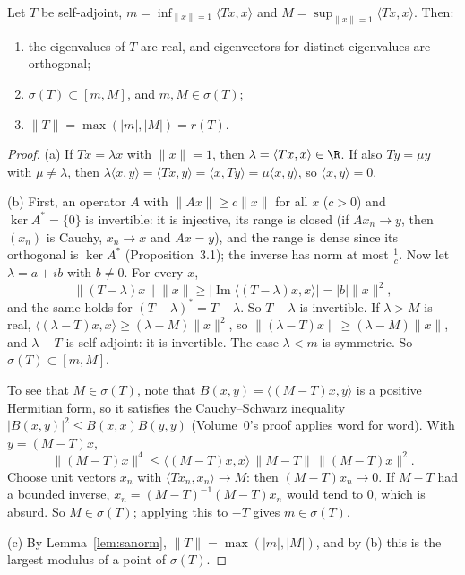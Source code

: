 \begin{proposition}\label{prop:saspec}
Let $T$ be self-adjoint, $m=\inf_{\|x\|=1}\langle Tx,x\rangle$ and $M=\sup_{\|x\|=1}\langle Tx,x\rangle$. Then:
\begin{enumerate}
\item[(a)] the eigenvalues of $T$ are real, and eigenvectors for distinct eigenvalues are orthogonal;
\item[(b)] $\sigma(T)\subset[m,M]$, and $m,M\in\sigma(T)$;
\item[(c)] $\|T\|=\max(|m|,|M|)=r(T)$.
\end{enumerate}
\end{proposition}
\begin{proof}
(a) If $Tx=\lambda x$ with $\|x\|=1$, then $\lambda=\langle Tx,x\rangle\in\R$. If also $Ty=\mu y$ with $\mu\ne\lambda$, then $\lambda\langle x,y\rangle=\langle Tx,y\rangle=\langle x,Ty\rangle=\mu\langle x,y\rangle$, so $\langle x,y\rangle=0$.

(b) First, an operator $A$ with $\|Ax\|\ge c\|x\|$ for all $x$ ($c>0$) and $\ker A^*=\{0\}$ is invertible: it is injective, its range is closed (if $Ax_n\to y$, then $(x_n)$ is Cauchy, $x_n\to x$ and $Ax=y$), and the range is dense since its
orthogonal is $\ker A^*$ (Proposition~3.1); the inverse has norm at most $\frac1c$. Now let $\lambda=a+ib$ with $b\ne0$. For every $x$,
\[\|(T-\lambda)x\|\|x\|\ge|\operatorname{Im}\langle(T-\lambda)x,x\rangle|=|b|\|x\|^2,\]
and the same holds for $(T-\lambda)^*=T-\bar\lambda$. So $T-\lambda$ is invertible. If $\lambda>M$ is real, $\langle(\lambda-T)x,x\rangle\ge(\lambda-M)\|x\|^2$, so $\|(\lambda-T)x\|\ge(\lambda-M)\|x\|$, and $\lambda-T$ is self-adjoint:
it is invertible. The case $\lambda<m$ is symmetric. So $\sigma(T)\subset[m,M]$.

To see that $M\in\sigma(T)$, note that $B(x,y)=\langle(M-T)x,y\rangle$ is a positive Hermitian form, so it satisfies the Cauchy--Schwarz inequality $|B(x,y)|^2\le B(x,x)B(y,y)$ (Volume~0's proof applies word for word). With $y=(M-T)x$,
\[\|(M-T)x\|^4\le\langle(M-T)x,x\rangle\,\|M-T\|\,\|(M-T)x\|^2.\]
Choose unit vectors $x_n$ with $\langle Tx_n,x_n\rangle\to M$: then $(M-T)x_n\to0$. If $M-T$ had a bounded inverse, $x_n=(M-T)^{-1}(M-T)x_n$ would tend to $0$, which is absurd. So $M\in\sigma(T)$; applying this to $-T$ gives $m\in\sigma(T)$.

(c) By Lemma~\ref{lem:sanorm}, $\|T\|=\max(|m|,|M|)$, and by (b) this is the largest modulus of a point of $\sigma(T)$.
\end{proof}

